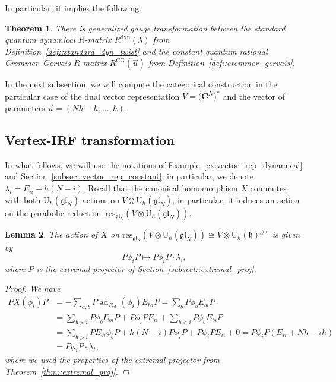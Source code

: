 \documentclass[10pt,a4paper]{article}
\numberwithin{equation}{section}
\newtheorem{Theorem}{Theorem}[section]
\newtheorem{Lemma}[Theorem]{Lemma}
\newcommand{\C}{\mathbf{C}}
\newcommand{\U}{\mathrm{U}_{\hbar}}
\newcommand{\h}{\mathfrak{h}}
\DeclareMathOperator{\ad}{ad}
\newcommand{\dyn}{\mathrm{dyn}}
\newcommand{\gen}{\mathrm{gen}}
\newcommand{\res}{\mathrm{res}}
\newcommand{\gl}{\mathfrak{gl}}
\begin{document}
	In particular, it implies the following.

	\begin{Theorem}
		\label{thm::the_vertex-irf}
		There is generalized gauge transformation between the standard quantum dynamical $R$-matrix $R^{\dyn}(\lambda)$ from Definition~{\rm\ref{def::standard_dyn_twist}} and the constant quantum rational Cremmer--Gervais $R$-matrix $R^{\mathrm{CG}}(\vec{u})$ from Definition~{\rm\ref{def::cremmer_gervais}}.
	\end{Theorem}

	
	In the next subsection, we will compute the categorical construction in the particular case of the dual vector representation $V = \bigl(\C^N\bigr)^*$ and the vector of parameters $\vec{u} = (N\hbar - \hbar,\dots,\hbar)$.
	
	\subsection{Vertex-IRF transformation}
	
	In what follows, we will use the notations of Example~\ref{ex:vector_rep_dynamical} and Section~\ref{subsect:vector_rep_constant}; in particular, we denote $\lambda_i = E_{ii} + \hbar(N-i)$. Recall that the canonical homomorphism $X$ commutes with both $\U(\gl_N)$-actions on $V \otimes \U(\gl_N)$, in particular, it induces an action on the parabolic reduction~$\res_{\gl_N}(V \otimes \U(\gl_N))$.
	
	\begin{Lemma}
		\label{lm:canonical_homomorphism_parabolic}
		The action of $X$ on $\res_{\gl_N}(V \otimes \U(\gl_N)) \cong V \otimes \U(\h)^{\gen}$ is given by
		\[
		P \phi_i P \mapsto P\phi_i P \cdot \lambda_i,
		\]
		where $P$ is the extremal projector of Section~{\rm\ref{subsect::extremal_proj}}.
		\begin{proof}
			We have
			\begin{align*}
				PX(\phi_i)P &= -\sum\limits_{a,b} P \ad_{E_{ab}}(\phi_i) E_{ba} P = \sum\limits_b P \phi_b E_{bi} P \\
&= \sum\limits_{b>i} P \phi_b E_{bi} P + P\phi_i P E_{ii} + \sum\limits_{b<i} P \phi_b E_{bi} P \\
				&= \sum\limits_{b>i} P E_{bi} \phi_b P +\hbar (N-i) P\phi_i P + P\phi_i P E_{ii} + 0 = P \phi_i P (E_{ii}+N\hbar - i\hbar) \\
				&= P\phi_i P \cdot \lambda_i,
			\end{align*}
			where we used the properties of the extremal projector from Theorem~\ref{thm::extremal_proj}.
		\end{proof}
	\end{Lemma}
	
\end{document}
